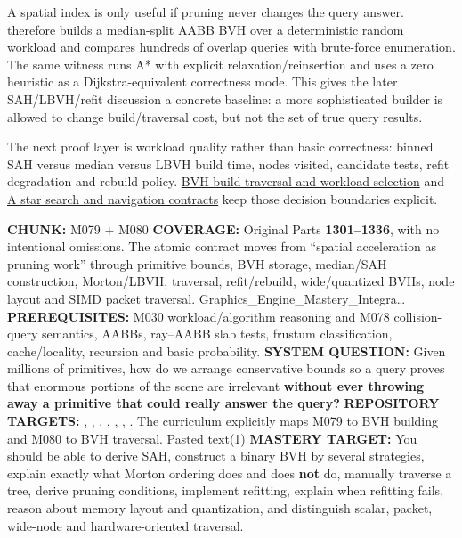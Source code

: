 \hypertarget{06-engine-ii-ch027-reconstruction-checkpoint-compare-the-hierarchy-with-an-oracle}{}

A spatial index is only useful if pruning never changes the query answer.  therefore builds a median-split AABB BVH over a deterministic random workload and compares hundreds of overlap queries with brute-force enumeration. The same witness runs A* with explicit relaxation/reinsertion and uses a zero heuristic as a Dijkstra-equivalent correctness mode. This gives the later SAH/LBVH/refit discussion a concrete baseline: a more sophisticated builder is allowed to change build/traversal cost, but not the set of true query results.

The next proof layer is workload quality rather than basic correctness: binned SAH versus median versus LBVH build time, nodes visited, candidate tests, refit degradation and rebuild policy. \hyperref[appendix-5653a7aea6bb]{BVH build traversal and workload selection} and \hyperref[appendix-5803241aa1a5]{A star search and navigation contracts} keep those decision boundaries explicit.

\textbf{CHUNK:} M079 + M080 \textbf{COVERAGE:} Original Parts \textbf{1301--1336}, with no intentional omissions. The atomic contract moves from ``spatial acceleration as pruning work'' through primitive bounds, BVH storage, median/SAH construction, Morton/LBVH, traversal, refit/rebuild, wide/quantized BVHs, node layout and SIMD packet traversal. Graphics\_Engine\_Mastery\_Integra\ldots{} \textbf{PREREQUISITES:} M030 workload/algorithm reasoning and M078 collision-query semantics, AABBs, ray--AABB slab tests, frustum classification, cache/locality, recursion and basic probability. \textbf{SYSTEM QUESTION:} Given millions of primitives, how do we arrange conservative bounds so a query proves that enormous portions of the scene are irrelevant \textbf{without ever throwing away a primitive that could really answer the query?} \textbf{REPOSITORY TARGETS:} , , , , , , . The curriculum explicitly maps M079 to BVH building and M080 to BVH traversal. Pasted text(1) \textbf{MASTERY TARGET:} You should be able to derive SAH, construct a binary BVH by several strategies, explain exactly what Morton ordering does and does \textbf{not} do, manually traverse a tree, derive pruning conditions, implement refitting, explain when refitting fails, reason about memory layout and quantization, and distinguish scalar, packet, wide-node and hardware-oriented traversal.

